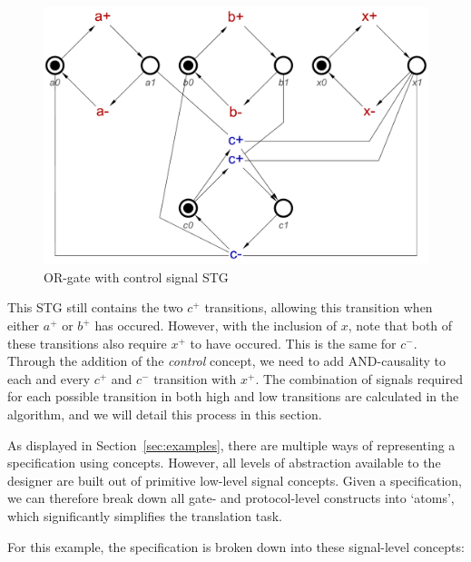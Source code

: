 \documentclass[british, journal]{IEEEtran}
\begin{document}
\begin{figure}[h]
\begin{centering}
\includegraphics[scale=0.25]{Images/or-gate-ctrl-stg}
\par\end{centering}
\vspace{-1mm}
\protect\caption{\label{fig:or-gate-ctrl} OR-gate with control signal STG}
\vspace{-3mm}
\end{figure}

This STG still contains the two $c^{+}$ transitions, allowing this transition when either 
$a^{+}$ or $b^{+}$ has occured. However, with the inclusion of $x$, note that both
of these transitions also require $x^{+}$ to have occured. This is the same for $c^{-}$. 
Through the addition of the \emph{control} concept, we need to add AND-causality to
each and every $c^{+}$ and $c^{-}$ transition with $x^{+}$. The combination of signals
required for each possible transition in both high and low transitions are calculated in the
algorithm, and we will detail this process in this section.

As displayed in Section~\ref{sec:examples}, there are multiple ways of
representing a specification using concepts. However, all levels of
abstraction available to the designer are built out of primitive low-level
signal concepts. Given a specification, we can therefore
break down all gate- and protocol-level constructs into `atoms', which
significantly simplifies the translation task.

For this example, the specification is broken down into these signal-level concepts:
\end{document}

